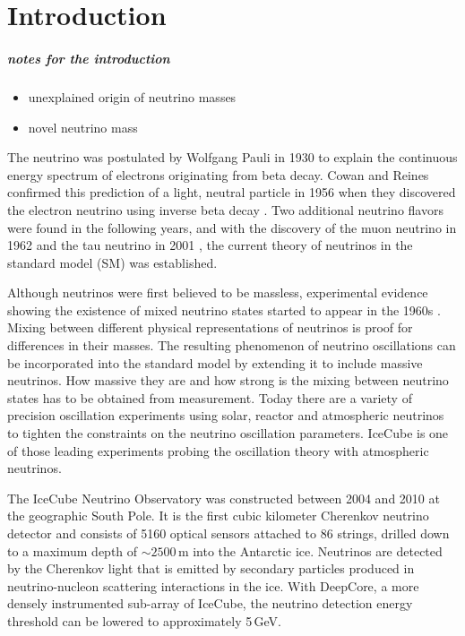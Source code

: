 \setchapterpreamble[u]{\margintoc}

\chapter{Introduction}


\paragraph{notes for the introduction}
\begin{itemize}
    \item unexplained origin of neutrino masses
    \item novel neutrino mass 
\end{itemize}



The neutrino was postulated by Wolfgang Pauli  in 1930 to explain the continuous energy spectrum of electrons originating from beta decay.
Cowan and Reines confirmed this prediction of a light, neutral particle in 1956 when they discovered the electron neutrino using inverse beta decay .
Two additional neutrino flavors were found in the following years, and with the discovery of the muon neutrino in 1962  and the tau neutrino in 2001 , the current theory of neutrinos in the standard model (SM) was established.

Although neutrinos were first believed to be massless, experimental evidence showing the existence of mixed neutrino states started to appear in the 1960s .
Mixing between different physical representations of neutrinos is proof for differences in their masses.
The resulting phenomenon of neutrino oscillations can be incorporated into the standard model by extending it to include massive neutrinos.
How massive they are and how strong is the mixing between neutrino states has to be obtained from measurement.
Today there are a variety of precision oscillation experiments using solar, reactor and atmospheric neutrinos to tighten the constraints on the neutrino oscillation parameters.
IceCube is one of those leading experiments probing the oscillation theory with atmospheric neutrinos.

The IceCube Neutrino Observatory  was constructed between 2004 and 2010 at the geographic South Pole.
It is the first cubic kilometer Cherenkov neutrino detector and consists of 5160 optical sensors attached to 86 strings, drilled down to a maximum depth of $\sim2500$\,m into the Antarctic ice.
Neutrinos are detected by the Cherenkov light that is emitted by secondary particles produced in neutrino-nucleon scattering interactions in the ice.
With DeepCore, a more densely instrumented sub-array of IceCube, the neutrino detection energy threshold can be lowered to approximately 5\,GeV.

